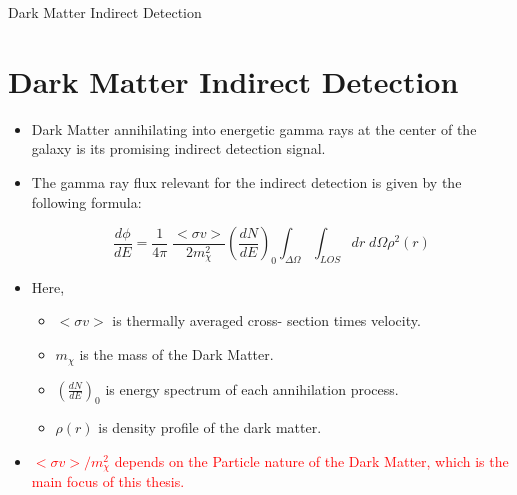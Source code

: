 \documentclass[11pt]{beamer}
\begin{document}
\begin{frame}{Dark Matter Indirect Detection}

\section{Dark Matter Indirect Detection}
\begin{itemize}


\item Dark Matter annihilating into energetic gamma rays at the center of the galaxy is its promising indirect detection signal.

\item The gamma ray flux relevant for the indirect detection is given by the following formula:

\begin{equation*}
\frac{d\phi}{dE} =  \frac{1}{4 \pi}\; \frac{<\sigma v> }{2 m^2_\chi} \left(\frac{dN}{dE}\right)_0 \int_{\Delta\Omega} \int_{LOS} dr\; d\Omega \rho^2(r) \label{indeq}
\end{equation*}


\item Here,
	\begin{itemize}
	\item $<\sigma v> $ is thermally averaged cross-			section times velocity.
	\item $m_\chi$ is the mass of the Dark Matter.
	\item $\left(\frac{dN}{dE}\right)_0$ is energy 			spectrum of each annihilation process.
	\item $\rho(r)$ is density profile of the dark 			matter.
	\end{itemize}

\item \textcolor{red}{ $<\sigma v>/ m^2_\chi$ depends on the Particle nature of the Dark Matter, which is the main focus of this thesis.}
	\end{itemize}

\end{frame}
\end{document}
